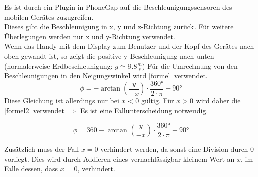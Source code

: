 Es ist durch ein Plugin in PhoneGap auf die Beschleunigungssensoren des mobilen Gerätes zuzugreifen.\\
Dieses gibt die Beschleunigung in x, y und z-Richtung zurück. Für weitere Überlegungen werden nur x und y-Richtung verwendet.\\
Wenn das Handy mit dem Display zum Benutzer und der Kopf des Gerätes nach oben gewandt ist, so zeigt die positive y-Beschleunigung nach unten (normalerweise Erdbeschleunigung: $g \simeq 9.8 \frac{m}{s}$)
Für die Umrechnung von den Beschleunigungen in den Neigungswinkel wird \autoref{formel} verwendet.
\begin{equation}
\phi = - \arctan(\frac{y}{-x}) \cdot \frac{360°}{2 \cdot \pi} - 90°
\label{formel}
\end{equation}
Diese Gleichung ist allerdings nur bei  $ x < 0 $ gültig. Für $ x > 0 $ wird daher die \autoref{formel2} verwendet $ \Rightarrow $ Es ist eine Fallunterscheidung notwendig.

\begin{equation}
\phi = 360 - \arctan(\frac{y}{-x}) \cdot \frac{360°}{2 \cdot \pi} - 90°
\label{formel2}
\end{equation}

Zusätzlich muss der Fall $ x = 0 $ verhindert werden, da sonst eine Division durch 0 vorliegt. Dies wird durch Addieren eines vernachlässigbar kleinem Wert an $ x $, im Falle dessen, dass $ x = 0 $, verhindert.
